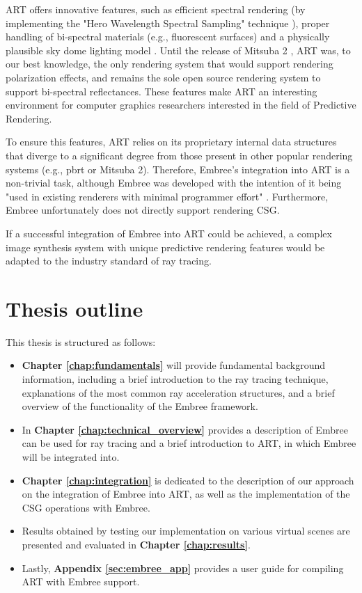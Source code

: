 ART offers innovative features, such as efficient spectral rendering (by implementing the "Hero Wavelength Spectral Sampling" technique \cite{wilkie2014hero}), proper handling of bi-spectral materials (e.g., fluorescent surfaces) \cite{mojzik2018handling} and a physically plausible sky dome lighting model \cite{wilkie2013predicting}. Until the release of Mitsuba 2 \cite{nimier2019mitsuba}, ART was, to our best knowledge, the only rendering system that would support rendering polarization effects, and remains the sole open source rendering system to support bi-spectral reflectances. These features make ART an interesting environment for computer graphics researchers interested in the field of Predictive Rendering.

To ensure this features, ART relies on its proprietary internal data structures that diverge to a significant degree from those present in other popular rendering systems (e.g., pbrt \cite{pharr2016physically} or Mitsuba 2). Therefore, Embree's integration into ART is a non-trivial task, although Embree was developed with the intention of it being "used in existing renderers with minimal programmer effort" \cite[1]{wald2014embree}. Furthermore, Embree unfortunately does not directly support rendering CSG.

If a successful integration of Embree into ART could be achieved, a complex image synthesis system with unique predictive rendering features would be adapted to the industry standard of ray tracing. 

\section*{Thesis outline}

This thesis is structured as follows:

\begin{itemize}
	\setlength\itemsep{0.05em}
	
	\item \textbf{Chapter \ref{chap:fundamentals}} will provide fundamental background information, including a brief introduction to the ray tracing technique, explanations of the most common ray acceleration structures, and a brief overview of the functionality of the Embree framework.
	
	\item In \textbf{Chapter \ref{chap:technical_overview}} provides a description of Embree can be used for ray tracing and a brief introduction to ART, in which Embree will be integrated into.
	
	\item \textbf{Chapter \ref{chap:integration}} is dedicated to the description of our approach on the integration of Embree into ART, as well as the implementation of the CSG operations with Embree.
	
	\item Results obtained by testing our implementation on various virtual scenes are presented and evaluated in \textbf{Chapter \ref{chap:results}}.
	
	\item Lastly, \textbf{Appendix \ref{sec:embree_app}} provides a user guide for compiling ART with Embree support.
	
\end{itemize}
